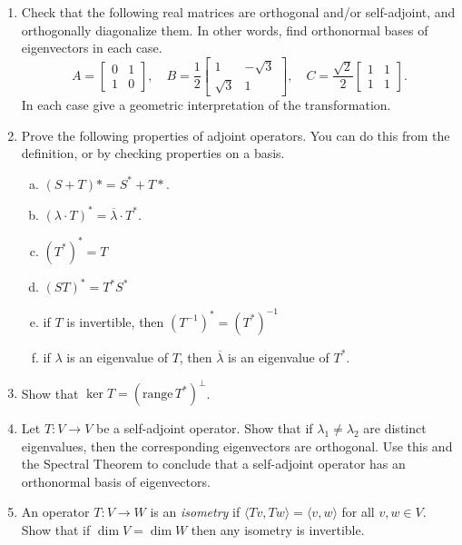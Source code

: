 \documentclass[a4paper,11pt]{article}
\theoremstyle{definition}
\begin{document}
\begin{enumerate}[(1)]
    \item
    Check that the following real matrices are orthogonal and/or self-adjoint, and orthogonally diagonalize them.
    In other words, find orthonormal bases of eigenvectors in each case.
    \[
    A=\begin{bmatrix}
        0&1 \\ 1&0
    \end{bmatrix},
    \quad
    B=\dfrac{1}{2}\begin{bmatrix}
        1&-\sqrt 3 \\ \sqrt 3&1
    \end{bmatrix},
    \quad
    C=\dfrac{\sqrt 2}{2}\begin{bmatrix}
        1&1\\ 1&1
    \end{bmatrix}.
    \]
    In each case give a geometric interpretation of the transformation.\newpage
    \item 
    Prove the following properties of adjoint operators.
    You can do this from the definition, or by checking properties on a basis.
    \begin{enumerate}[(a)]
        \item 
        $(S+T)* = S^*+T*$.
        \item 
        $(\lambda\cdot T)^*=\overline\lambda\cdot T^*$.
        \item
        $(T^*)^* = T$
        \item
        $(ST)^*=T^*S^*$
        \item 
        if $T$ is invertible, then $(T^{-1})^*=(T^*)^{-1}$
        \item 
        if $\lambda$ is an eigenvalue of $T$, then $\overline\lambda$ is an eigenvalue of $T^*$.
    \end{enumerate}

    \item 
    Show that $\ker T = (\text{range}\,T^*)^\perp$.

    \item 
    Let $T:V\to V$ be a self-adjoint operator.
    Show that if $\lambda_1\neq \lambda_2$ are distinct eigenvalues, then the corresponding eigenvectors are orthogonal.
    Use this and the Spectral Theorem to conclude that a self-adjoint operator has an orthonormal basis of eigenvectors.

    \item 
    An operator $T:V\to W$ is an \textit{isometry} if $\langle Tv,Tw\rangle = \langle v,w\rangle$ for all $v,w\in V$.
    Show that if $\dim V=\dim W$ then any isometry is invertible.
    

\end{enumerate}
\end{document}
